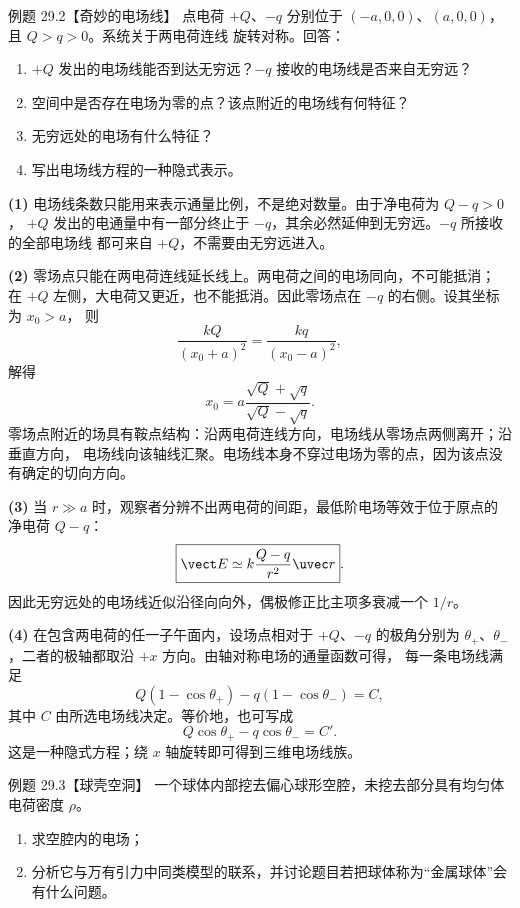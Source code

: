 \Needspace{0.35\textheight}
\begin{origexamplebox}{例题 29.2【奇妙的电场线】}
点电荷 $+Q$、$-q$ 分别位于 $(-a,0,0)$、$(a,0,0)$，且 $Q>q>0$。系统关于两电荷连线
旋转对称。回答：
\begin{enumerate}[label=(\arabic*),leftmargin=2.2em]
  \item $+Q$ 发出的电场线能否到达无穷远？$-q$ 接收的电场线是否来自无穷远？
  \item 空间中是否存在电场为零的点？该点附近的电场线有何特征？
  \item 无穷远处的电场有什么特征？
  \item 写出电场线方程的一种隐式表示。
\end{enumerate}
\unequalChargeDiagram
\end{origexamplebox}

\begin{xesolution}
\textbf{(1)} 电场线条数只能用来表示通量比例，不是绝对数量。由于净电荷为 $Q-q>0$，
$+Q$ 发出的电通量中有一部分终止于 $-q$，其余必然延伸到无穷远。$-q$ 所接收的全部电场线
都可来自 $+Q$，不需要由无穷远进入。

\textbf{(2)} 零场点只能在两电荷连线延长线上。两电荷之间的电场同向，不可能抵消；
在 $+Q$ 左侧，大电荷又更近，也不能抵消。因此零场点在 $-q$ 的右侧。设其坐标为 $x_0>a$，
则
\[
  \frac{kQ}{(x_0+a)^2}=\frac{kq}{(x_0-a)^2},
\]
解得
\[
  \boxed{x_0=a\frac{\sqrt Q+\sqrt q}{\sqrt Q-\sqrt q}}.
\]
零场点附近的场具有鞍点结构：沿两电荷连线方向，电场线从零场点两侧离开；沿垂直方向，
电场线向该轴线汇聚。电场线本身不穿过电场为零的点，因为该点没有确定的切向方向。

\textbf{(3)} 当 $r\gg a$ 时，观察者分辨不出两电荷的间距，最低阶电场等效于位于原点的
净电荷 $Q-q$：
\[
  \boxed{\vect E\simeq k\frac{Q-q}{r^2}\uvec r}.
\]
因此无穷远处的电场线近似沿径向向外，偶极修正比主项多衰减一个 $1/r$。

\textbf{(4)} 在包含两电荷的任一子午面内，设场点相对于 $+Q$、$-q$ 的极角分别为
$\theta_+$、$\theta_-$，二者的极轴都取沿 $+x$ 方向。由轴对称电场的通量函数可得，
每一条电场线满足
\[
  \boxed{Q(1-\cos\theta_+)-q(1-\cos\theta_-)=C},
\]
其中 $C$ 由所选电场线决定。等价地，也可写成
\[
  Q\cos\theta_+-q\cos\theta_-=C'.
\]
这是一种隐式方程；绕 $x$ 轴旋转即可得到三维电场线族。
\end{xesolution}

\Needspace{0.37\textheight}
\begin{origexamplebox}{例题 29.3【球壳空洞】}
一个球体内部挖去偏心球形空腔，未挖去部分具有均匀体电荷密度 $\rho$。
\begin{enumerate}[label=(\arabic*),leftmargin=2.2em]
  \item 求空腔内的电场；
  \item 分析它与万有引力中同类模型的联系，并讨论题目若把球体称为“金属球体”会有什么问题。
\end{enumerate}
\cavityDiagram
\end{origexamplebox}

